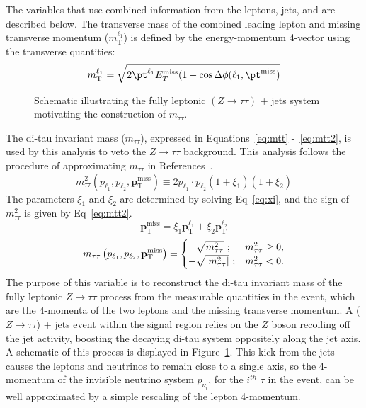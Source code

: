 The variables that use combined information from the leptons, jets, and \met{} are described below.  The transverse mass of the combined leading lepton and missing transverse momentum ($m_\text{T}^{\ell_1}$) is defined by the energy-momentum 4-vector using the transverse quantities:
\begin{equation}
\label{eq:mt}
m_\mathrm{T}^{\ell_1} = \sqrt{2\pt^{\ell_1}E^{\mathrm{miss}}_T(1-\cos\Delta\phi(\ell_1,\pt^{\mathrm{miss}})} 
\end{equation}
   \begin{figure}
  \centering
  
  \caption{Schematic illustrating the fully leptonic $(Z\to\tau\tau)$ + jets system motivating the construction of $m_{\tau\tau}$. }
  \label{fig:ditau_schematic}
  \end{figure}
The di-tau invariant mass ($m_{\tau\tau}$), expressed in Equations~\ref{eq:mtt} -~\ref{eq:mtt2}, is used by this analysis to veto the $Z\rightarrow\tau\tau$ background.  This analysis follows the procedure of approximating $m_{\tau\tau}$ in References~\cite{Han:2014kaa, Baer:2014kya}. 
 \begin{equation}
 \label{eq:mtt}
 m^2_{\tau\tau}\left(p_{\ell_1}, p_{\ell_2}, \mathbf{p}_\mathrm{T}^\mathrm{miss}\right) \equiv 2p_{\ell_1}\cdot p_{\ell_2}(1+\xi_1)(1+\xi_2)
 \end{equation}
 The parameters $\xi_1$ and $\xi_2$ are determined by solving Eq~\ref{eq:xi}, and the sign of $m^2_{\tau\tau}$ is given by Eq~\ref{eq:mtt2}.
  \begin{equation}
   \label{eq:xi}
  \mathbf{p}_\mathrm{T}^\mathrm{miss} = \xi_1\mathbf{p}_\mathrm{T}^\mathrm{\ell_1}+\xi_2\mathbf{p}_\mathrm{T}^\mathrm{\ell_2}
   \end{equation}
 \begin{equation}
 \label{eq:mtt2}
 m_{\tau\tau}\left(p_{\ell_1}, p_{\ell_2}, \mathbf{p}_\mathrm{T}^\mathrm{miss}\right) =
\begin{cases}
\hphantom{-}\sqrt{m_{\tau\tau}^2}~;               & m_{\tau\tau}^2 \geq 0,\\
 -\sqrt{\left| m_{\tau\tau}^2\right|}~; & m_{\tau\tau}^2 < 0.
\end{cases} 
 \end{equation} 
 The purpose of this variable is to reconstruct the di-tau invariant mass of the fully leptonic $Z\rightarrow\tau\tau$ process from the measurable quantities in the event, which are the 4-momenta of the two leptons and the missing transverse momentum.  A ($Z\rightarrow\tau\tau$) + jets event within the signal region relies on the $Z$ boson recoiling off the jet activity, boosting the decaying di-tau system oppositely along the jet axis.  A schematic of this process is displayed in Figure~\ref{fig:ditau_schematic}.  This kick from the jets causes the leptons and neutrinos to remain close to a single axis, so the 4-momentum of the invisible neutrino system $p_{\nu_i}$, for the $i^{th}$ $\tau$ in the event, can be well approximated by a simple rescaling of the lepton 4-momentum.  
 
